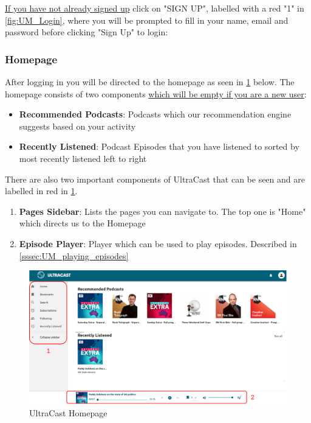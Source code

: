 \documentclass[../report.tex]{subfiles}
\begin{document}
\underline{If you have not already signed up} click on "SIGN UP", labelled with a red "1" in \cref{fig:UM_Login}, where
you will be prompted to fill in your name, email and password before clicking "Sign Up" to login:

\newpage

\subsubsection{Homepage}

After logging in you will be directed to the homepage as seen in \cref{fig:UM_Homepage} below. The 
homepage consists of two components \underline{which will be empty if you are a new user}:
%
\begin{itemize}
    \item \textbf{Recommended Podcasts}: Podcasts which our recommendation engine suggests based on your activity
    \item \textbf{Recently Listened}: Podcast Episodes that you have listened to sorted by most recently listened left to right
\end{itemize}
%
There are also two important components of UltraCast that can be seen and are labelled in red in \cref{fig:UM_Homepage}.
\begin{enumerate}
    \item \textbf{Pages Sidebar}: Lists the pages you can navigate to. The top one is "Home" which directs us to the Homepage
    \item \textbf{Episode Player}: Player which can be used to play episodes. Described in \cref{sssec:UM_playing_episodes}
\end{enumerate}

\begin{figure}[ht] 
    \centering
    \includegraphics[width=16cm]{resources/UM_Homepage}
    \caption{UltraCast Homepage}
    \label{fig:UM_Homepage} 
\end{figure}
\end{document}
